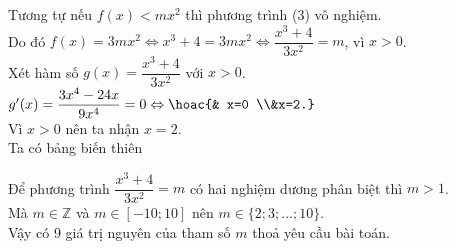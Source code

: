 \begin{ex}[Sở Hà Tĩnh 2022]
{		Tương tự nếu $f(x)<m x^2$ thì phương trình (3) vô nghiệm.\\
		Do đó $f(x)=3 m x^2 \Leftrightarrow x^3+4=3 m x^2 \Leftrightarrow \dfrac{x^3+4}{3 x^2} =m$, vì $x>0$.\\
		Xét hàm số $g(x)=\dfrac{x^3+4}{3x^2}$ với $x>0$.\\
		$g'(x)=\dfrac{3x^4-24x}{9x^4}=0\Leftrightarrow \hoac{& x=0 \\&x=2.}$\\
		Vì $x>0$ nên ta nhận $x=2$.\\
		Ta có bảng biến thiên
		\begin{center}
		\end{center}
		Để phương trình $\dfrac{x^3+4}{3x^2} =m$ có hai nghiệm dương phân biệt thì $m>1$.\\
		Mà $m \in \mathbb{Z} $ và $m \in[-10 ; 10]$ nên $m \in\{2 ; 3 ; \ldots ; 10\} $.\\
		Vậy có 9 giá trị nguyên của tham số $m$ thoả yêu cầu bài toán.
	}
\end{ex}
